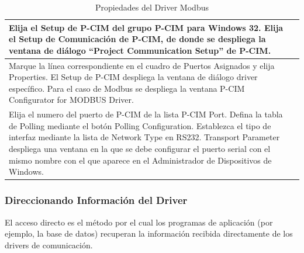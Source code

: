 \begin{table}[H]
\centering
\renewcommand*{\arraystretch}{0.01}
\begin{tabular}{*{2}{m{}}}
\hline
  Elija el Setup de P-CIM del grupo P-CIM para Windows 32.
  Elija el Setup de Comunicación de P-CIM, de donde se despliega la ventana 
  de diálogo “Project Communication Setup” de P-CIM.
  &\begin{center}
    \rule{0.4\textwidth}{0.3\textwidth}
  \end{center}\\
\hline
  Marque la línea correspondiente en el cuadro de Puertos Asignados y elija 
  Properties. El Setup de P-CIM despliega la ventana de diálogo driver 
  específico. Para el caso de Modbus se despliega la ventana P-CIM Configurator 
  for MODBUS Driver.
  &\begin{center}
    \rule{0.4\textwidth}{0.3\textwidth}
  \end{center}\\
\hline
   Elija el numero del puerto de P-CIM de la lista P-CIM Port. Defina la tabla 
   de Polling mediante el botón Polling Configuration. Establezca el tipo de 
   interfaz mediante la lista de Network Type en RS232. Transport Parameter 
   despliega una ventana en la que se debe configurar el puerto serial con  el 
   mismo nombre con el que aparece en el Administrador de Dispositivos de 
   Windows.
  &\begin{center}
    \rule{0.4\textwidth}{0.3\textwidth}
  \end{center}\\
\hline
\end{tabular}
\label{tab:PropModbus}
\caption{Propiedades del Driver Modbus}
\end{table}

\subsubsection{Direccionando Información del Driver}
\label{subsubsec:InforDriver}
El acceso directo es el método por el cual los programas de aplicación (por
ejemplo, la base de datos) recuperan la información recibida directamente de 
los drivers de comunicación.

